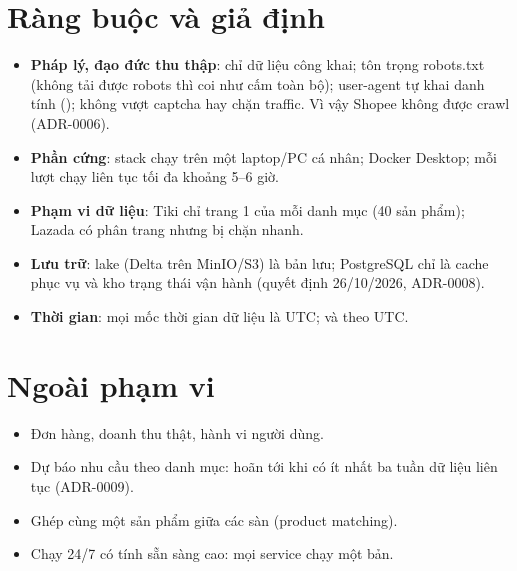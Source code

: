 \section{Ràng buộc và giả định}
\begin{itemize}
  \item \textbf{Pháp lý, đạo đức thu thập}: chỉ dữ liệu công khai; tôn trọng robots.txt (không tải được robots thì coi như cấm toàn bộ);
        user-agent tự khai danh tính (); không vượt captcha hay chặn traffic.
        Vì vậy Shopee không được crawl (ADR-0006).
  \item \textbf{Phần cứng}: stack chạy trên một laptop/PC cá nhân; Docker Desktop; mỗi lượt chạy liên tục tối đa khoảng 5--6 giờ.
  \item \textbf{Phạm vi dữ liệu}: Tiki chỉ trang 1 của mỗi danh mục (40 sản phẩm); Lazada có phân trang nhưng bị chặn nhanh.
  \item \textbf{Lưu trữ}: lake (Delta trên MinIO/S3) là bản lưu; PostgreSQL chỉ là cache phục vụ và kho trạng thái vận hành (quyết định 26/10/2026, ADR-0008).
  \item \textbf{Thời gian}: mọi mốc thời gian dữ liệu là UTC;  và  theo UTC.
\end{itemize}

\section{Ngoài phạm vi}
\begin{itemize}
  \item Đơn hàng, doanh thu thật, hành vi người dùng.
  \item Dự báo nhu cầu theo danh mục: hoãn tới khi có ít nhất ba tuần dữ liệu liên tục (ADR-0009).
  \item Ghép cùng một sản phẩm giữa các sàn (product matching).
  \item Chạy 24/7 có tính sẵn sàng cao: mọi service chạy một bản.
\end{itemize}
